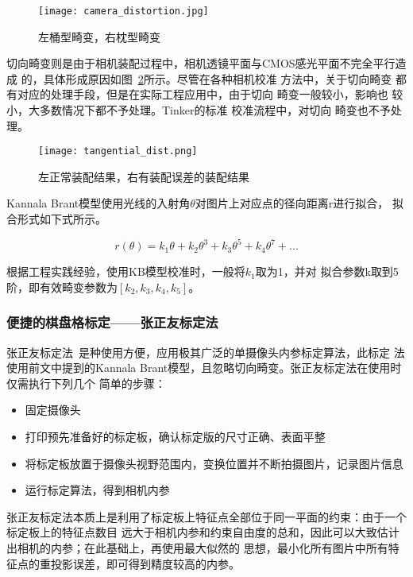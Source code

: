 \begin{figure}[ht] %
  \centering
  \texttt{[image: camera\_distortion.jpg]}
  \caption{左桶型畸变，右枕型畸变}
  \label{fig:radial_distort}
\end{figure}

切向畸变则是由于相机装配过程中，相机透镜平面与CMOS感光平面不完全平行造成
的，具体形成原因如图~\ref{fig:tangential_distort}所示。尽管在各种相机校准
方法中，关于切向畸变 都有对应的处理手段，但是在实际工程应用中，由于切向
畸变一般较小，影响也 较小，大多数情况下都不予处理。Tinker的标准
校准流程中，对切向 畸变也不予处理。

\begin{figure}[ht] %
  \centering
  \texttt{[image: tangential\_dist.png]}
  \caption{左正常装配结果，右有装配误差的装配结果}
  \label{fig:tangential_distort}
\end{figure}

Kannala Brant模型使用光线的入射角$\theta$对图片上对应点的径向距离r进行拟合，
拟合形式如下式所示。

\begin{equation}
  r(\theta) = k_1\theta + k_2\theta^{3} + k_3\theta^{5} + k_4\theta^{7} + ...
\end{equation}

根据工程实践经验，使用KB模型校准时，一般将$k_1$取为1，并对
拟合参数{k}取到5阶，即有效畸变参数为$[k_2, k_3, k_4, k_5]$。

\subsubsection{便捷的棋盘格标定——张正友标定法}

张正友标定法~\cite{zhang2000flexible}是种使用方便，应用极其广泛的单摄像头内参标定算法，此标定
法使用前文中提到的Kannala Brant模型，且忽略切向畸变。张正友标定法在使用时仅需执行下列几个
简单的步骤：

\begin{itemize}
  \item 固定摄像头
  \item 打印预先准备好的标定板，确认标定版的尺寸正确、表面平整
  \item 将标定板放置于摄像头视野范围内，变换位置并不断拍摄图片，记录图片信息
  \item 运行标定算法，得到相机内参
\end{itemize}

张正友标定法本质上是利用了标定板上特征点全部位于同一平面的约束：由于一个标定板上的特征点数目
远大于相机内参和约束自由度的总和，因此可以大致估计出相机的内参；在此基础上，再使用最大似然的
思想，最小化所有图片中所有特征点的重投影误差，即可得到精度较高的内参。

